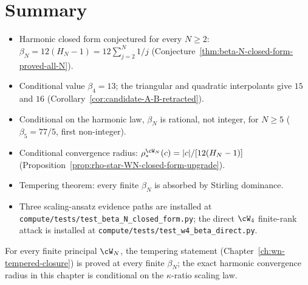 \section{Summary}
\label{sec:beta-N-summary}

\begin{itemize}[nosep]
\item Harmonic closed form conjectured for every $N \ge 2$:
 $\beta_N = 12(H_N - 1) = 12 \sum_{j=2}^{N} 1/j$
 (Conjecture~\ref{thm:beta-N-closed-form-proved-all-N}).
\item Conditional value $\beta_4 = 13$; the triangular and quadratic interpolants give
 $15$ and $16$
 (Corollary~\ref{cor:candidate-A-B-retracted}).
\item Conditional on the harmonic law, $\beta_N$ is rational, not integer, for $N \ge 5$ ($\beta_5 = 77/5$,
 first non-integer).
\item Conditional convergence radius:
 $\rho_*^{\cW_N}(c) = |c|/[12(H_N - 1)]$
 (Proposition~\ref{prop:rho-star-WN-closed-form-upgrade}).
\item Tempering theorem: every finite $\beta_N$ is absorbed by
 Stirling dominance.
\item Three scaling-ansatz evidence paths are installed at
 \texttt{compute/tests/test\_beta\_N\_closed\_form.py}; the direct
 $\cW_4$ finite-rank attack is installed at
 \texttt{compute/tests/test\_w4\_beta\_direct.py}.
\end{itemize}

For every finite principal $\cW_N$, the tempering statement
(Chapter~\ref{ch:wn-tempered-closure}) is proved at every finite
$\beta_N$; the exact harmonic convergence radius in this chapter is
conditional on the $\kappa$-ratio scaling law.

